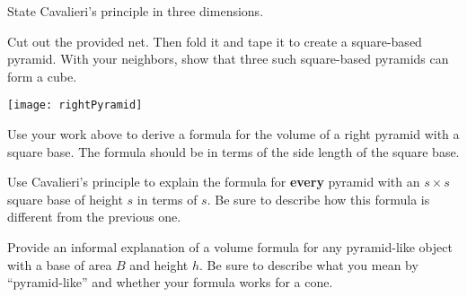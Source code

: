 \documentclass[nooutcomes]{ximera}
\begin{document}
\begin{problem}
State Cavalieri's principle in three dimensions.  
\vfill
\end{problem}

%
%
%
\newpage

\begin{problem}
Cut out the provided net.  Then fold it and tape it to create a square-based pyramid.  With your neighbors, show that three such square-based pyramids can form a cube.  
\begin{image}
\texttt{[image: rightPyramid]}
\end{image}
\end{problem}

\newpage
\begin{problem}
Use your work above to derive a formula for the volume of a
right pyramid with a square base. The formula should be in terms of
the side length of the square base.
\vfill
\end{problem}

\begin{problem}
Use Cavalieri's principle to explain the formula for \textbf{every} pyramid with an $s\times s$ square base of height $s$ in terms of $s$.  Be sure to describe how this formula is different from the previous one.  
\vfill
\end{problem}

\begin{problem}
Provide an informal explanation of a volume formula for any pyramid-like object with a base of area $B$ and height $h$.  Be sure to describe what you mean by ``pyramid-like'' and whether your formula works for a cone.  
\vfill
\end{problem}

%  
\end{document}
